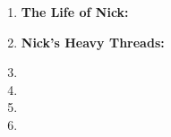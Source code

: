 \documentclass[11pt]{article}
\begin{document}
\begin{enumerate}
\item {\bf The Life of Nick:}
    

\pagebreak
\item {\bf Nick's Heavy Threads:}
	

\item 

\item 

\newpage
\item 

\item 

\end{enumerate}
\end{document}
